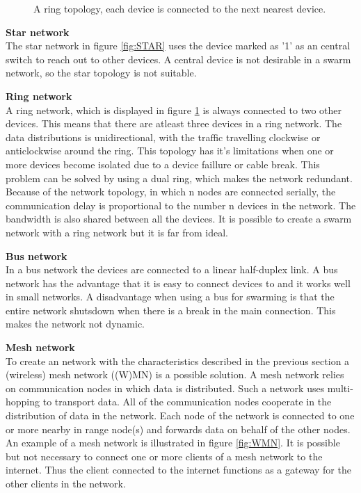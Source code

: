 \documentclass[10pt,a4paper]{article}
\begin{document}
\begin{figure}[H]
  \caption{A ring topology, each device is connected to the next nearest device.}\label{fig:RING}
\endminipage
\end{figure}

\textbf{Star network}\\
The star network in figure \ref{fig:STAR} uses the device marked as '1' as an central switch to reach out to other devices.\cite{starwiki} A central device is not desirable in a swarm network, so the star topology is not suitable.

\textbf{Ring network}\\
A ring network, which is displayed in figure \ref{fig:RING} is always connected to two other devices. This means that there are atleast three devices in a ring network. The data distributions is unidirectional, with the traffic travelling clockwise or anticlockwise around the ring. \cite{ringwiki} This topology has it's limitations when one or more devices become isolated due to a device faillure or cable break. This problem can be solved by using a dual ring, which makes the network redundant. Because of the network topology, in which n nodes are connected serially, the communication delay is proportional to the number n devices in the network. The bandwidth is also shared between all the devices. \cite{ringwiki} It is possible to create a swarm network with a ring network but it is far from ideal.

\textbf{Bus network}\\
In a bus network the devices are connected to a linear half-duplex link. \cite{bustopology} A bus network has the advantage that it is easy to connect devices to and it works well in small networks. A disadvantage when using a bus for swarming is that the entire network shutsdown when there is a break in the main connection. This makes the network not dynamic.

\textbf{Mesh network}\\
To create an network with the characteristics described in the previous section a (wireless) mesh network ((W)MN) is a possible solution. A mesh network relies on communication nodes in which data is distributed. Such a network uses multi-hopping to transport data.\cite{multi-hopwirelessnetworks} All of the communication nodes cooperate in the distribution of data in the network. Each node of the network is connected to one or more nearby in range node(s) and forwards data on behalf of the other nodes. \cite{meshnetworking} An example of a mesh network is illustrated in figure \ref{fig:WMN}. It is possible but not necessary to connect one or more clients of a mesh network to the internet. Thus the client connected to the internet functions as a gateway for the other clients in the network. \cite{wirelessmeshnetworksopportunitiesandchallenges}
\end{document}
